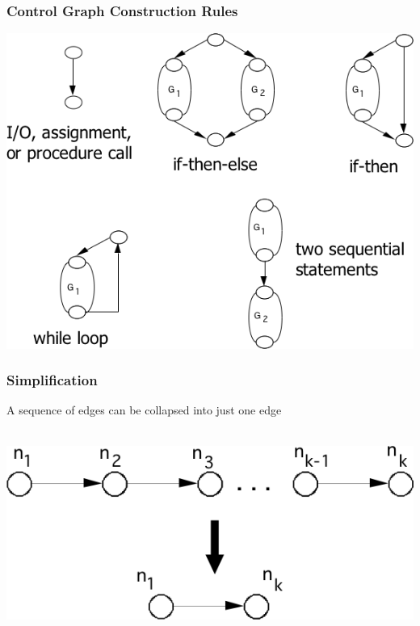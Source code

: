 \documentclass[t,12pt,numbers,fleqn]{beamer}
\begin{document}

\begin{frame}
\frametitle{Control Graph Construction Rules}

\includegraphics[scale=0.4]{../Figures/ControlGraphRules.png}

\end{frame}


\begin{frame}
\frametitle{Simplification}

A sequence of edges can be collapsed into just one edge\\
~\newline

\includegraphics[scale=0.5]{../Figures/Simplification.png}

\end{frame}

\end{document}
